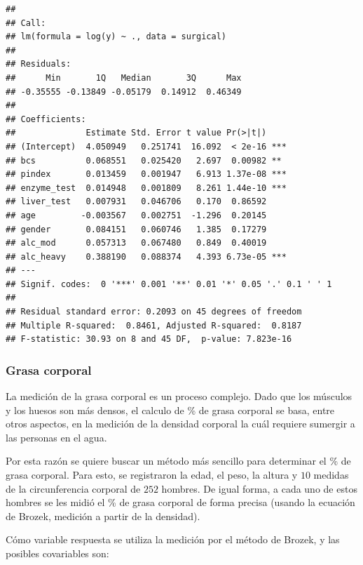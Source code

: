 \documentclass[
]{article}
\begin{document}
\begin{verbatim}
## 
## Call:
## lm(formula = log(y) ~ ., data = surgical)
## 
## Residuals:
##      Min       1Q   Median       3Q      Max 
## -0.35555 -0.13849 -0.05179  0.14912  0.46349 
## 
## Coefficients:
##              Estimate Std. Error t value Pr(>|t|)    
## (Intercept)  4.050949   0.251741  16.092  < 2e-16 ***
## bcs          0.068551   0.025420   2.697  0.00982 ** 
## pindex       0.013459   0.001947   6.913 1.37e-08 ***
## enzyme_test  0.014948   0.001809   8.261 1.44e-10 ***
## liver_test   0.007931   0.046706   0.170  0.86592    
## age         -0.003567   0.002751  -1.296  0.20145    
## gender       0.084151   0.060746   1.385  0.17279    
## alc_mod      0.057313   0.067480   0.849  0.40019    
## alc_heavy    0.388190   0.088374   4.393 6.73e-05 ***
## ---
## Signif. codes:  0 '***' 0.001 '**' 0.01 '*' 0.05 '.' 0.1 ' ' 1
## 
## Residual standard error: 0.2093 on 45 degrees of freedom
## Multiple R-squared:  0.8461, Adjusted R-squared:  0.8187 
## F-statistic: 30.93 on 8 and 45 DF,  p-value: 7.823e-16
\end{verbatim}

\hypertarget{grasa-corporal-1}{%
\subsubsection{Grasa corporal}\label{grasa-corporal-1}}

La medición de la grasa corporal es un proceso complejo. Dado que los músculos y los huesos son más densos, el calculo de \% de grasa corporal se basa, entre otros aspectos, en la medición de la densidad corporal la cuál requiere sumergir a las personas en el agua.

Por esta razón se quiere buscar un método más sencillo para determinar el \% de grasa corporal. Para esto, se registraron la edad, el peso, la altura y \(10\) medidas de la circunferencia corporal de \(252\) hombres. De igual forma, a cada uno de estos hombres se les midió el \% de grasa corporal de forma precisa (usando la ecuación de Brozek, medición a partir de la densidad).

Cómo variable respuesta se utiliza la medición por el método de Brozek, y las posibles covariables son:
\end{document}
